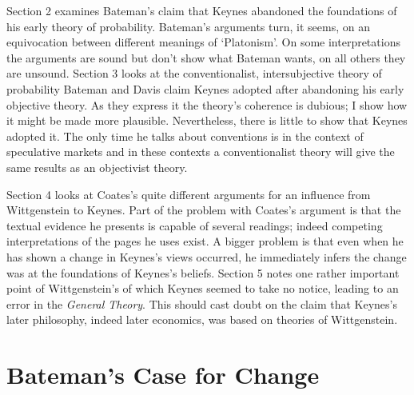 \documentclass[
  10pt,
  letterpaper,
  DIV=11,
  numbers=noendperiod,
  twoside]{scrartcl}
\begin{document}
Section 2 examines Bateman's claim that Keynes abandoned the foundations
of his early theory of probability. Bateman's arguments turn, it seems,
on an equivocation between different meanings of `Platonism'. On some
interpretations the arguments are sound but don't show what Bateman
wants, on all others they are unsound. Section 3 looks at the
conventionalist, intersubjective theory of probability Bateman and Davis
claim Keynes adopted after abandoning his early objective theory. As
they express it the theory's coherence is dubious; I show how it might
be made more plausible. Nevertheless, there is little to show that
Keynes adopted it. The only time he talks about conventions is in the
context of speculative markets and in these contexts a conventionalist
theory will give the same results as an objectivist theory.

Section 4 looks at Coates's quite different arguments for an influence
from Wittgenstein to Keynes. Part of the problem with Coates's argument
is that the textual evidence he presents is capable of several readings;
indeed competing interpretations of the pages he uses exist. A bigger
problem is that even when he has shown a change in Keynes's views
occurred, he immediately infers the change was at the foundations of
Keynes's beliefs. Section 5 notes one rather important point of
Wittgenstein's of which Keynes seemed to take no notice, leading to an
error in the \emph{General Theory}. This should cast doubt on the claim
that Keynes's later philosophy, indeed later economics, was based on
theories of Wittgenstein.

\section{Bateman's Case for Change}\label{batemans-case-for-change}
\end{document}
